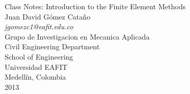 %
\begin{center}
\Large{Class Notes: Introduction to the Finite Element Methods}
\large
\\[30mm]
Juan David G\'omez Cata\~no\\
\emph{jgomezc1@eafit.edu.co}
\\[40mm]
Grupo de Investigacion en Mecanica Aplicada
\\
Civil Engineering Department
\\
School of Engineering
\\
Universidad EAFIT
\\
Medell\'in, Colombia
\\
2013
\end{center}
\thispagestyle{empty}